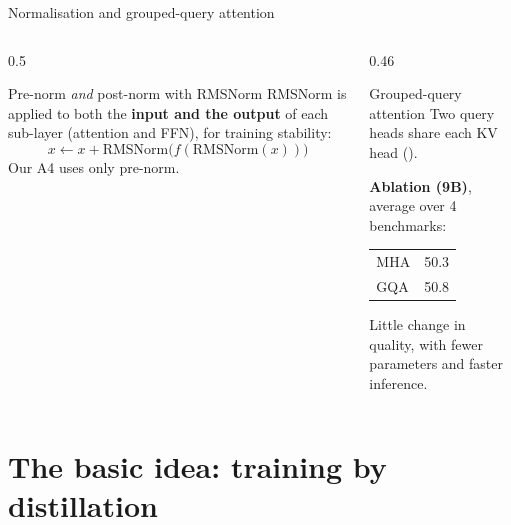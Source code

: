 \documentclass[aspectratio=169,11pt]{beamer}
\begin{document}
\begin{frame}{Normalisation and grouped-query attention}
  \begin{columns}[T]
    \begin{column}{0.5\textwidth}
      \begin{block}{Pre-norm \emph{and} post-norm with RMSNorm}
        \small
        RMSNorm is applied to both the \textbf{input and the output} of each sub-layer (attention and FFN), for training stability:
        \[
          x\leftarrow x+\text{RMSNorm}\big(f(\text{RMSNorm}(x))\big)
        \]
        {\scriptsize Our A4 uses only pre-norm.}
      \end{block}
    \end{column}
    \begin{column}{0.46\textwidth}
      \begin{block}{Grouped-query attention}
        \small
        Two query heads share each KV head ().
        \vspace{1mm}

        \textbf{Ablation (9B)}, average over 4 benchmarks:
        \vspace{1mm}

        \begin{tabular}{@{}lc@{}}
          \toprule
          MHA & 50.3\\
          GQA & 50.8\\
          \bottomrule
        \end{tabular}
        \vspace{1mm}

        Little change in quality, with fewer parameters and faster inference.
      \end{block}
    \end{column}
  \end{columns}
\end{frame}

\section{The basic idea: training by distillation}
\end{document}
